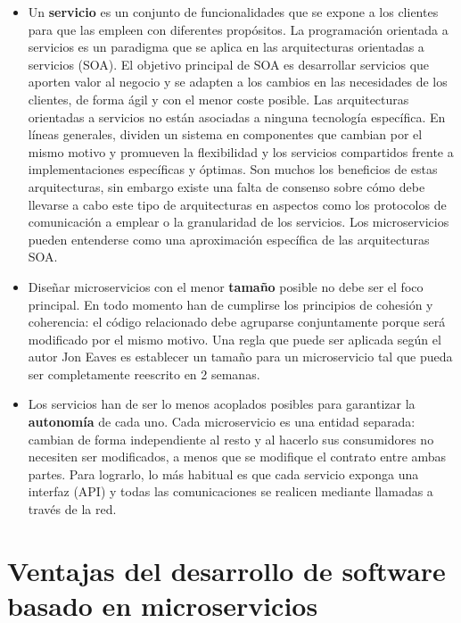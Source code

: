 \documentclass[11pt,spanish,listoffigures,listoftables]{tfgetsinf}
\begin{document}
\begin{itemize}

\item Un \textbf{servicio} es un conjunto de funcionalidades que se expone a los clientes para que las empleen con diferentes propósitos. La programación orientada a servicios es un paradigma que se aplica en las arquitecturas orientadas a servicios (SOA). El objetivo principal de SOA es desarrollar servicios que aporten valor al negocio y se adapten a los cambios en las necesidades de los clientes, de forma ágil y con el menor coste posible. Las arquitecturas orientadas a servicios no están asociadas a ninguna tecnología específica. En líneas generales, dividen un sistema en componentes que cambian por el mismo motivo y promueven la flexibilidad y los servicios compartidos frente a implementaciones específicas y óptimas. Son muchos los beneficios de estas arquitecturas, sin embargo existe una falta de consenso sobre cómo debe llevarse a cabo este tipo de arquitecturas en aspectos como los protocolos de comunicación a emplear o la granularidad de los servicios. Los microservicios pueden entenderse como una aproximación específica de las arquitecturas SOA.

\item Diseñar microservicios con el menor \textbf{tamaño} posible no debe ser el foco principal. En todo momento han de cumplirse los principios de cohesión y coherencia: el código relacionado debe agruparse conjuntamente porque será modificado por el mismo motivo. Una regla que puede ser aplicada según el autor Jon Eaves es establecer un tamaño para un microservicio tal que pueda ser completamente reescrito en 2 semanas.

\item  Los servicios han de ser lo menos acoplados posibles para garantizar la \textbf{autonomía} de cada uno. Cada microservicio es una entidad separada: cambian de forma independiente al resto y al hacerlo sus consumidores no necesiten ser modificados, a menos que se modifique el contrato entre ambas partes. Para lograrlo, lo más habitual es que cada servicio exponga una interfaz (API) y todas las comunicaciones se realicen mediante llamadas a través de la red.

\end{itemize}

\section{Ventajas del desarrollo de software basado en microservicios}
\end{document}
